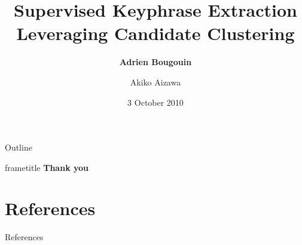 \documentclass[xcolor={usenames, dvipsnames}]{beamer}
\title{Supervised Keyphrase Extraction Leveraging Candidate Clustering}
\subtitle{}
\author{\textbf{Adrien Bougouin} \and Akiko Aizawa}
\institute{\normalsize{NII, Tokyo (JAPAN)}}
\date{3 October 2010}
\begin{document}
  \renewcommand*{\theenumii}{\alph{enumii}}
  \renewcommand*{\theenumiii}{\roman{enumiii}}

  \begin{frame}
    \titlepage
  \end{frame}
  \setcounter{framenumber}{0}

  
  \begin{frame}{Outline}
    \tableofcontents
  \end{frame}
  
  
  
  
  \begin{frame}
    \vfill
    \begin{beamercolorbox}[center,shadow=true,rounded=true]{frametitle} 
      \Huge{\textbf{Thank you}}
    \end{beamercolorbox} 
    \vfill
  \end{frame}
  \section*{References}
    \begin{frame}[allowframebreaks]{References}
      \def\newblock{\hskip .11em plus .33em minus .07em}
      
      
    \end{frame}
\end{document}

